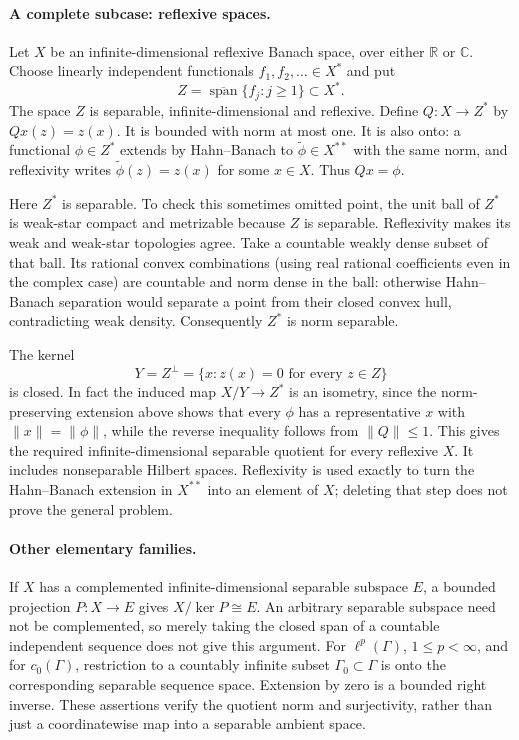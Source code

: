 \documentclass[11pt]{article}
\begin{document}
\paragraph{A complete subcase: reflexive spaces.}
Let $X$ be an infinite-dimensional reflexive Banach space, over either
$\mathbb R$ or $\mathbb C$. Choose linearly independent functionals
$f_1,f_2,\ldots\in X^*$ and put
\[
 Z=\overline{\operatorname{span}}\{f_j:j\geq1\}\subset X^*.
\]
The space $Z$ is separable, infinite-dimensional and reflexive. Define
$Q:X\to Z^*$ by $Qx(z)=z(x)$. It is bounded with norm at most one.
It is also onto: a functional $\phi\in Z^*$ extends by Hahn--Banach to
$\widetilde\phi\in X^{**}$ with the same norm, and reflexivity writes
$\widetilde\phi(z)=z(x)$ for some $x\in X$. Thus $Qx=\phi$.

Here $Z^*$ is separable. To check this sometimes omitted point, the unit
ball of $Z^*$ is weak-star compact and metrizable because $Z$ is separable.
Reflexivity makes its weak and weak-star topologies agree. Take a countable
weakly dense subset of that ball. Its rational convex combinations (using
real rational coefficients even in the complex case) are countable and
norm dense in the ball: otherwise Hahn--Banach separation would separate
a point from their closed convex hull, contradicting weak density.
Consequently $Z^*$ is norm separable.

The kernel
\[
 Y=Z^\perp=\{x:z(x)=0\text{ for every }z\in Z\}
\]
is closed. In fact the induced map $X/Y\to Z^*$ is an isometry, since
the norm-preserving extension above shows that every $\phi$ has a
representative $x$ with $\|x\|=\|\phi\|$, while the reverse inequality
follows from $\|Q\|\leq1$. This gives the required infinite-dimensional
separable quotient for every reflexive $X$. It includes nonseparable
Hilbert spaces. Reflexivity is used exactly to turn the Hahn--Banach
extension in $X^{**}$ into an element of $X$; deleting that step does
not prove the general problem.

\paragraph{Other elementary families.}
If $X$ has a complemented infinite-dimensional separable subspace $E$,
a bounded projection $P:X\to E$ gives $X/\ker P\cong E$. An arbitrary
separable subspace need not be complemented, so merely taking the
closed span of a countable independent sequence does not give this
argument. For $\ell^p(\Gamma)$, $1\leq p<\infty$, and for $c_0(\Gamma)$,
restriction to a countably infinite subset $\Gamma_0\subset\Gamma$
is onto the corresponding separable sequence space. Extension by zero
is a bounded right inverse. These assertions verify the quotient norm
and surjectivity, rather than just a coordinatewise map into a
separable ambient space.
\end{document}

